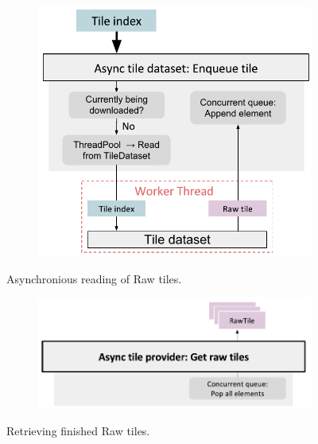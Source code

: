 \begin{figure}[htbp]
    \centering
    \begin{subfigure}[bt]{0.7\textwidth}
        \includegraphics[width=\textwidth]{figures/implementation/pipeline/asynctiledataset.pdf}
    \end{subfigure}
    \caption{Asynchronious reading of Raw tiles.}
    \label{fig:asynctiledataset}
\end{figure}

\begin{figure}[htbp]
    \centering
    \begin{subfigure}[bt]{0.7\textwidth}
        \includegraphics[width=\textwidth]{figures/implementation/pipeline/asynctiledataset_gettiles.pdf}
    \end{subfigure}
    \caption{Retrieving finished Raw tiles.}
    \label{fig:asynctiledataset2}
\end{figure}

